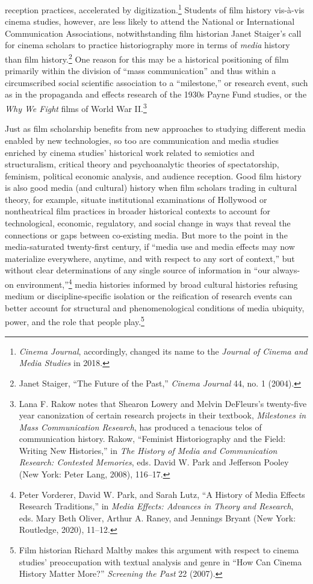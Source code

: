 \documentclass{tufte-handout}
\begin{document}
\noindent reception practices, accelerated by
digitization.\footnote{\emph{Cinema Journal}, accordingly, changed its
  name to the \emph{Journal of Cinema and Media Studies} in 2018.} Students of film history vis-à-vis cinema studies, however, are less
likely to attend the National or International Communication
Associations, notwithstanding film historian Janet Staiger's call for
cinema scholars to practice historiography more in terms of \emph{media}
history than film history.\footnote{Janet Staiger, ``The Future of the
  Past,'' \emph{Cinema Journal} 44, no. 1 (2004).} One reason for this
may be a historical positioning of film primarily within the division of
``mass communication'' and thus within a circumscribed social scientific
association to a ``milestone,'' or research event, such as in the
propaganda and effects research of the 1930s Payne Fund studies, or the
\emph{Why We Fight} films of World War II.\footnote{Lana F. Rakow notes
  that Shearon Lowery and Melvin DeFleurs's twenty-five year
  canonization of certain research projects in their textbook,
  \emph{Milestones in Mass Communication Research}, has produced a
  tenacious telos of communication history. Rakow, ``Feminist
  Historiography and the Field: Writing New Histories,'' in \emph{The
  History of Media and Communication Research: Contested Memories}, eds.
  David W. Park and Jefferson Pooley (New York: Peter Lang, 2008),
  116--17.}

Just as film scholarship benefits from new approaches to studying
different media enabled by new technologies, so too are communication
and media studies enriched by cinema studies' historical work related to
semiotics and structuralism, critical theory and psychoanalytic theories
of spectatorship, feminism, political economic analysis, and audience
reception. Good film history is also good media (and cultural) history
when film scholars trading in cultural theory, for example, situate
institutional examinations of Hollywood or nontheatrical film practices
in broader historical contexts to account for technological, economic,
regulatory, and social change in ways that reveal the connections or
gaps between co-existing media. But more to the point in the
media-saturated twenty-first century, if ``media use and media effects
may now materialize everywhere, anytime, and with respect to any sort of
context,'' but without clear determinations of any single source of
information in ``our always-on environment,''\footnote{Peter Vorderer,
  David W. Park, and Sarah Lutz, ``A History of Media Effects Research
  Traditions,'' in \emph{Media Effects: Advances in Theory and
  Research}, eds. Mary Beth Oliver, Arthur A. Raney, and Jennings Bryant
  (New York: Routledge, 2020), 11--12.} media histories informed by
broad cultural histories refusing medium or discipline-specific
isolation or the reification of research events can better account for
structural and phenomenological conditions of media ubiquity, power, and
the role that people play.\footnote{Film historian Richard Maltby makes
  this argument with respect to cinema studies' preoccupation with
  textual analysis and genre in ``How Can Cinema History Matter More?''
  \emph{Screening the Past} 22 (2007).}
\end{document}
